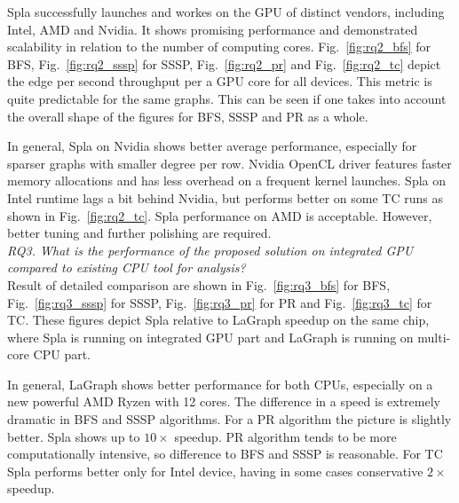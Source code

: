 Spla successfully launches and workes on the GPU of distinct vendors, including Intel, AMD and Nvidia. It shows promising performance and demonstrated scalability in relation to the number of computing cores. Fig.~\ref{fig:rq2_bfs} for BFS, Fig.~\ref{fig:rq2_sssp} for SSSP, Fig.~\ref{fig:rq2_pr} and Fig.~\ref{fig:rq2_tc} depict the edge per second throughput per a GPU core for all devices. This metric is quite predictable for the same graphs. This can be seen if one takes into account the overall shape of the figures for BFS, SSSP and PR as a whole.

In general, Spla on Nvidia shows better average performance, especially for sparser graphs with smaller degree per row. Nvidia OpenCL driver features faster memory allocations and has less overhead on a frequent kernel launches. Spla on Intel runtime lags a bit behind Nvidia, but performs better on some TC runs as shown in Fig.~\ref{fig:rq2_tc}. Spla performance on AMD is acceptable. However, better tuning and further polishing are required.\\

\textit{RQ3. What is the performance of the proposed solution on integrated GPU compared to existing CPU tool for analysis?}\\

Result of detailed comparison are shown in Fig.~\ref{fig:rq3_bfs} for BFS, Fig.~\ref{fig:rq3_sssp} for SSSP, Fig.~\ref{fig:rq3_pr} for PR and Fig.~\ref{fig:rq3_tc} for TC. These figures depict Spla relative to LaGraph speedup on the same chip, where Spla is running on integrated GPU part and LaGraph is running on multi-core CPU part. 

In general, LaGraph shows better performance for both CPUs, especially on a new powerful AMD Ryzen with 12 cores. The difference in a speed is extremely dramatic in BFS and SSSP algorithms. For a PR algorithm the picture is slightly better. Spla shows up to $10\times$ speedup. PR algorithm tends to be more computationally intensive, so difference to BFS and SSSP is reasonable. For TC Spla performs better only for Intel device, having in some cases conservative $2\times$ speedup. 

